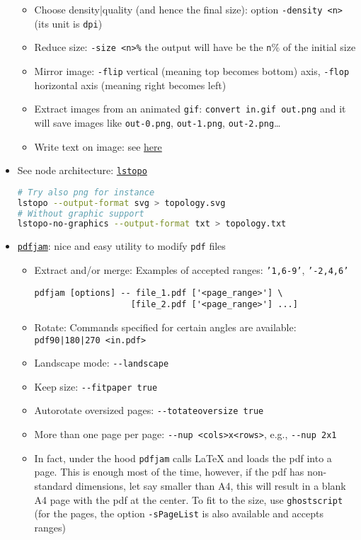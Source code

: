 \documentclass[a4paper,12pt,%
              final%
              ]{article}
\begin{document}
\begin{itemize}
\begin{itemize}
      \item Choose density|quality (and hence the final size): option \verb|-density <n>| (its unit is \texttt{dpi})
      \item Reduce size: \verb|-size <n>%| the output will have be the \verb|n|\% of the initial size
      \item Mirror image: \verb|-flip| vertical (meaning top becomes bottom) axis, \verb|-flop| horizontal axis (meaning right becomes left)
      \item Extract images from an animated \texttt{gif}: \verb|convert in.gif out.png| and it will save images like \texttt{out-0.png}, \texttt{out-1.png}, \texttt{out-2.png}\ldots
      \item Write text on image: see \href{https://stackoverflow.com/questions/23236898/add-text-on-image-at-specific-point-using-imagemagick}{here}
    \end{itemize}
  \item See node architecture: \href{https://linux.die.net/man/1/lstopo}{\texttt{lstopo}}
\begin{lstlisting}[language=bash]
# Try also png for instance
lstopo --output-format svg > topology.svg
# Without graphic support
lstopo-no-graphics --output-format txt > topology.txt
\end{lstlisting}
  \item \href{https://github.com/DavidFirth/pdfjam#using}{\texttt{pdfjam}}: nice and easy utility to modify \texttt{pdf} files
    \begin{itemize}
      \item Extract and/or merge: Examples of accepted ranges: \texttt{'1,6-9'}, \texttt{'-2,4,6'}
\begin{verbatim}
pdfjam [options] -- file_1.pdf ['<page_range>'] \
                   [file_2.pdf ['<page_range>'] ...]
\end{verbatim}
      \item Rotate: Commands specified for certain angles are available: \verb!pdf90|180|270 <in.pdf>!
      \item Landscape mode: \verb|--landscape|
      \item Keep size: \verb|--fitpaper true|
      \item Autorotate oversized pages: \verb|--totateoversize true|
      \item More than one page per page: \verb|--nup <cols>x<rows>|, e.g., \verb|--nup 2x1|
      \item In fact, under the hood \texttt{pdfjam} calls \LaTeX{} and loads the pdf into a page. This is enough most of the time, however, if the pdf has non-standard dimensions, let say smaller than A4, this will result in a blank A4 page with the pdf at the center. To fit to the size, use \texttt{ghostscript} (for the pages, the option \texttt{-sPageList} is also available and accepts ranges)

\end{itemize}
\end{itemize}
\end{document}

